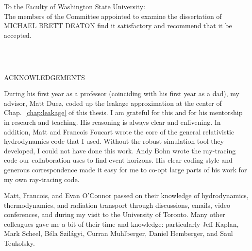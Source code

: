 \documentclass[12pt]{report}
\begin{document}
\begin{singlespace}
  \noindent
  \vspace{1.5in}

  \noindent To the Faculty of Washington State University:\\
  
  The members of the Committee appointed to examine the dissertation of
  \medskip
  \uppercase{Michael Brett Deaton}
  find it satisfactory and recommend that it be accepted.
  
  \begin{flushright}
    \\
    \\
  \end{flushright}
\end{singlespace}
\newpage

\begin{center}
  \uppercase{Acknowledgements}
\end{center}

  \bigskip
  During his first year as a professor (coinciding with his first
  year as a dad), my advisor, Matt Duez, coded up the leakage approximation
  at the center of Chap.~\ref{chap:leakage} of this thesis. I am grateful
  for this and for his mentorship in research and teaching. His reasoning is
  always clear and enlivening.
  In addition, Matt and Francois Foucart wrote the core of the general
  relativistic hydrodynamics code that I used. Without the robust simulation
  tool they developed, I could not have done this work.
  Andy Bohn wrote the ray-tracing code our collaboration uses to find event
  horizons. His clear coding style and generous correspondence made it easy
  for me to co-opt large parts of his work for my own ray-tracing code.

  Matt, Francois, and Evan O'Connor passed
  on their knowledge of hydrodynamics, thermodynamics, and radiation transport
  through discussions, emails, video conferences, and during my visit to the
  University of Toronto.
  Many other colleagues gave me a bit of their time and knowledge: particularly
  Jeff Kaplan, Mark Scheel, B\'ela Szil\'agyi, Curran Muhlberger,
  Daniel Hemberger, and Saul Teukolsky.
\end{document}
